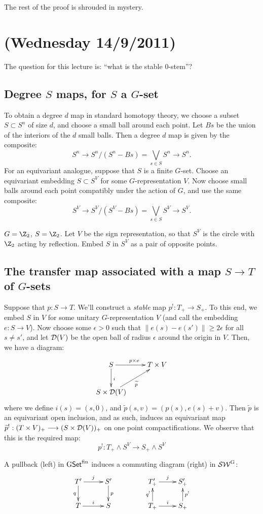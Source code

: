 \documentclass[11pt]{article}
\newcommand{\NewLecture}[3]{\section{#1 {\small(#2/#3/2011)}}}
\begin{document}
\begin{ThirdWeek}
The rest of the proof is shrouded in mystery.

\NewLecture{}{Wednesday 14}{9}
The question for this lecture is: ``what is the stable $0$-stem''?
\subsection*{Degree $S$ maps, for $S$ a $G$-set}
To obtain a degree $d$ map in standard homotopy theory, we choose a subset $S\subset S^n$ of size $d$, and choose a small ball around each point. Let $Bs$ be the union of the interiors of the $d$ small balls. Then a degree $d$ map is given by the composite:
\[S^n\to S^n/(S^n-Bs)=\textstyle{\bigvee}_{\!s\in S}S^n\to S^n.\]
For an equivariant analogue, suppose that $S$ is a finite $G$-set. Choose an equivariant embedding $S\subset S^V$ for some $G$-representation $V$. Now choose small balls around each point compatibly under the action of $G$, and use the same composite: 
\[S^V\to S^V/(S^V-Bs)=\textstyle{\bigvee}_{\!s\in S}S^V\to S^V.\]
\begin{exmp*}
$G=\Z_2$, $S=\Z_2$. Let $V$ be the sign representation, so that $S^V$ is the circle with $\Z_2$ acting by reflection. Embed $S$ in $S^V$ as a pair of opposite points.
\end{exmp*}
\subsection*{The transfer map associated with a map $S\to T$ of $G$-sets}
Suppose that $p:S\to T$. We'll construct a \emph{stable} map $p^!:T_+\to S_+$.  To this end, we embed $S$ in $V$ for some unitary $G$-representation $V$ (and call the embedding $e:S\to V$). Now choose some $\epsilon>0$ such that $\|e(s)-e(s')\|\geq 2\epsilon$ for all $s\neq s'$, and let $\mathcal{D}(V)$ be the open ball of radius $\epsilon$ around the origin in $V$. Then, we have a diagram:
\[\xymatrix{
S\ar[d]^i\ar[r]^{p\times e}&T\times V\\
S\times \calD(V)\ar[ur]_{\widetilde p}
}\]
where we define $i(s)=(s,0)$, and $\widetilde p(s,v)=(p(s),e(s)+v)$. Then $\widetilde p$ is an equivariant open inclusion, and as such, induces an equivariant map $\widetilde p^!:(T\times V)_+\longrightarrow (S\times \mathcal{D}(V))_+$ on one point compactifications. We observe that this is the required map:
\[p^!:T_+\wedge S^V\to S_+\wedge S^V\]
\begin{prop*}
A pullback (left) in $\operatorname{{G\mathsf{Set}^\textup{fin}}}$ induces a commuting diagram (right) in $\operatorname{{\mathcal{SW}^G}}$:
\[\xymatrix@!0@R=12mm@C=1.5cm{
\ar[d]_qT'\ar[r]^j&S'\ar[d]^p\\
T\ar[r]^i&S
}\qquad\qquad\xymatrix@!0@R=12mm@C=1.5cm{
\ar[d];[]^{q^!}T'_+\ar[r]^j&S'_+\ar[d];[]_{p^!}\\
T_+\ar[r]^i&S_+
}\]
\end{prop*}

\end{ThirdWeek}
\end{document}
